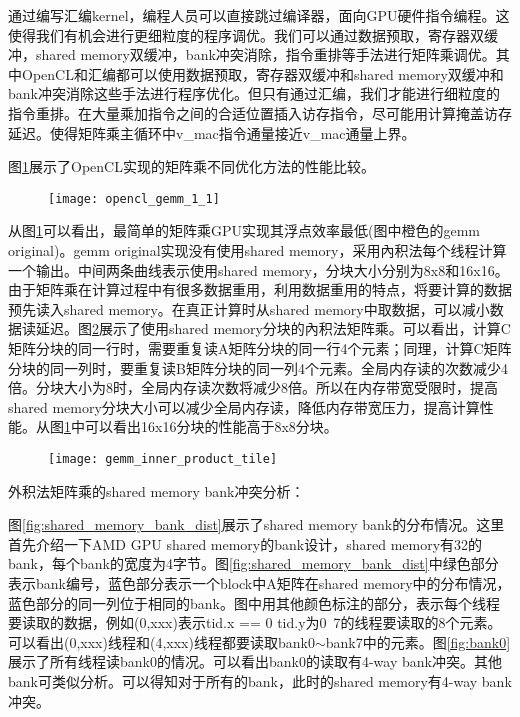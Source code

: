 通过编写汇编kernel，编程人员可以直接跳过编译器，面向GPU硬件指令编程。这使得我们有机会进行更细粒度的程序调优。我们可以通过数据预取，寄存器双缓冲，shared memory双缓冲，bank冲突消除，指令重排等手法进行矩阵乘调优。其中OpenCL和汇编都可以使用数据预取，寄存器双缓冲和shared memory双缓冲和bank冲突消除这些手法进行程序优化。但只有通过汇编，我们才能进行细粒度的指令重排。在大量乘加指令之间的合适位置插入访存指令，尽可能用计算掩盖访存延迟。使得矩阵乘主循环中v\_mac指令通量接近v\_mac通量上界。

图\ref{fig:opencl_gemm_1_1}展示了OpenCL实现的矩阵乘不同优化方法的性能比较。

\begin{figure}[htbp]
	\centering
	\texttt{[image: opencl\_gemm\_1\_1]}
	\label{fig:opencl_gemm_1_1}
\end{figure}

从图\ref{fig:opencl_gemm_1_1}可以看出，最简单的矩阵乘GPU实现其浮点效率最低(图中橙色的gemm original)。gemm original实现没有使用shared memory，采用內积法每个线程计算一个输出。中间两条曲线表示使用shared memory，分块大小分别为8x8和16x16。由于矩阵乘在计算过程中有很多数据重用，利用数据重用的特点，将要计算的数据预先读入shared memory。在真正计算时从shared memory中取数据，可以减小数据读延迟。图\ref{fig:gemm_inner_product_tile}展示了使用shared memory分块的內积法矩阵乘。可以看出，计算C矩阵分块的同一行时，需要重复读A矩阵分块的同一行4个元素；同理，计算C矩阵分块的同一列时，要重复读B矩阵分块的同一列4个元素。全局内存读的次数减少4倍。分块大小为8时，全局内存读次数将减少8倍。所以在内存带宽受限时，提高shared memory分块大小可以减少全局内存读，降低内存带宽压力，提高计算性能。从图\ref{fig:opencl_gemm_1_1}中可以看出16x16分块的性能高于8x8分块。

\begin{figure}[htbp]
	\centering
	\texttt{[image: gemm\_inner\_product\_tile]}
	\label{fig:gemm_inner_product_tile}
\end{figure}

外积法矩阵乘的shared memory bank冲突分析：

图\ref{fig:shared_memory_bank_dist}展示了shared memory bank的分布情况。这里首先介绍一下AMD GPU shared memory的bank设计，shared memory有32的bank，每个bank的宽度为4字节。图\ref{fig:shared_memory_bank_dist}中绿色部分表示bank编号，蓝色部分表示一个block中A矩阵在shared memory中的分布情况，蓝色部分的同一列位于相同的bank。图中用其他颜色标注的部分，表示每个线程要读取的数据，例如(0,xxx)表示tid.x == 0 tid.y为0~7的线程要读取的8个元素。可以看出(0,xxx)线程和(4,xxx)线程都要读取bank0$\sim$bank7中的元素。图\ref{fig:bank0}展示了所有线程读bank0的情况。可以看出bank0的读取有4-way bank冲突。其他bank可类似分析。可以得知对于所有的bank，此时的shared memory有4-way bank冲突。

